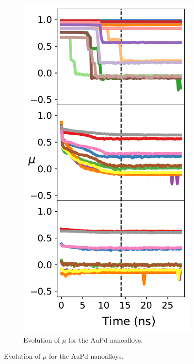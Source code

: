 \begin{figure}
    \centering
\begin{subfigure}{0.39\textwidth}
    \centering
    \smallskip
    \includegraphics[width=\linewidth]{figures/MD/Alloys/Mix_Au-Pd.pdf}
    \caption{Evolution of $\mu$ for the AuPd nanoalloys.}

\end{subfigure}
\end{figure}
